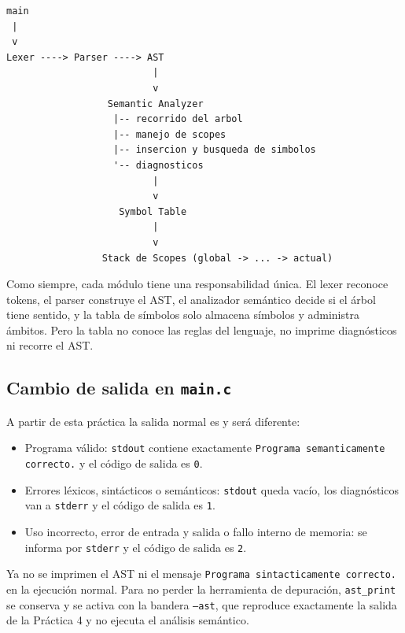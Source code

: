 \documentclass[12pt,letterpaper]{article}
\begin{document}
\begin{verbatim}
main
 |
 v
Lexer ----> Parser ----> AST
                          |
                          v
                  Semantic Analyzer
                   |-- recorrido del arbol
                   |-- manejo de scopes
                   |-- insercion y busqueda de simbolos
                   '-- diagnosticos
                          |
                          v
                    Symbol Table
                          |
                          v
                 Stack de Scopes (global -> ... -> actual)
\end{verbatim}

Como siempre, cada módulo tiene una responsabilidad única. El lexer reconoce tokens, el parser construye el AST,
el analizador semántico decide si el árbol tiene sentido, y la tabla de símbolos solo almacena símbolos y
administra ámbitos. Pero la tabla no conoce las reglas del lenguaje, no imprime diagnósticos ni recorre el AST.

\subsection*{Cambio de salida en \texttt{main.c}}

A partir de esta práctica la salida normal es y será diferente:

\begin{itemize}
\item Programa válido: \texttt{stdout} contiene exactamente \texttt{Programa semanticamente correcto.} y el
  código de salida es \texttt{0}.
  
\item Errores léxicos, sintácticos o semánticos: \texttt{stdout} queda vacío, los diagnósticos van a
  \texttt{stderr} y el código de salida es \texttt{1}.
  
\item Uso incorrecto, error de entrada y salida o fallo interno de memoria: se informa por \texttt{stderr} y el
  código de salida es \texttt{2}.
\end{itemize}

Ya no se imprimen el AST ni el mensaje \texttt{Programa sintacticamente correcto.} en la ejecución normal.
Para no perder la herramienta de depuración, \texttt{ast\_print} se conserva y se activa con la bandera
\texttt{--ast}, que reproduce exactamente la salida de la Práctica 4 y no ejecuta el análisis semántico.
\end{document}

